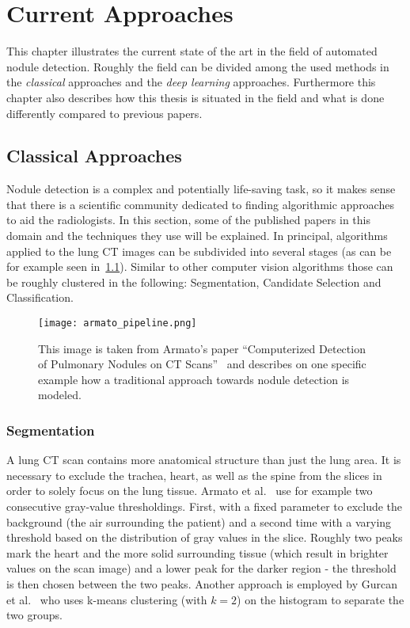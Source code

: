 \documentclass[main.tex]{subfiles}
\begin{document}
\chapter{Current Approaches}\label{chap:approaches}
This chapter illustrates the current state of the art in the field of automated nodule detection. Roughly the field can be divided among the used methods in the \emph{classical} approaches and the \emph{deep learning} approaches. Furthermore this chapter also describes how this thesis is situated in the field and what is done differently compared to previous papers.

\section{Classical Approaches}
Nodule detection is a complex and potentially life-saving task, so it makes sense that there is a scientific community dedicated to finding algorithmic approaches to aid the radiologists. In this section, some of the published papers in this domain and the techniques they use will be explained. In principal, algorithms applied to the lung CT images can be subdivided into several stages (as can be for example seen in~\ref{fig:pipeline}). Similar to other computer vision algorithms those can be roughly clustered in the following: Segmentation, Candidate Selection and Classification.


\begin{figure}[ht]
\centering
\texttt{[image: armato\_pipeline.png]}
\caption{This image is taken from Armato's paper ``Computerized Detection
of Pulmonary Nodules on CT Scans''~\cite{armato1999computerized} and describes on one specific example how a traditional approach towards nodule detection is modeled.}
\label{fig:pipeline}
\end{figure}


\subsection{Segmentation}
A lung CT scan contains more anatomical structure than just the lung area. It is necessary to exclude the trachea, heart, as well as the spine from the slices in order to solely focus on the lung tissue. Armato et al.~\cite{armato1999computerized,armato2001automated} use for example two consecutive gray-value thresholdings. First, with a fixed parameter to exclude the background (the air surrounding the patient) and a second time with a varying threshold based on the distribution of gray values in the slice. Roughly two peaks mark the heart and the more solid surrounding tissue (which result in brighter values on the scan image) and a lower peak for the darker region - the threshold is then chosen between the two peaks. Another approach is employed by Gurcan et al.~\cite{gurcan2002lung} who uses k-means clustering (with $k=2$) on the histogram to separate the two groups. 
\end{document}
